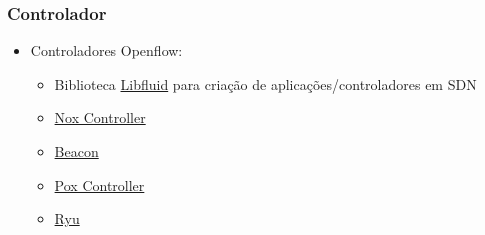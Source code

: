 %
%
\begin{frame}\frametitle{Controlador}

    \begin{itemize}
    \item Controladores Openflow:
          \begin{itemize}
          \item Biblioteca \href{http://opennetworkingfoundation.github.io/libfluid/index.html}{Libfluid}
                para criação de aplicações/controladores em SDN
          \item \href{http://www.noxrepo.org/nox/about-nox/}{Nox Controller}
          \item \href{https://openflow.stanford.edu/display/Beacon/Home}{Beacon}
          \item \href{http://www.noxrepo.org/pox/about-pox/}{Pox Controller}
          \item \href{http://osrg.github.io/ryu/}{Ryu}
          \end{itemize}
    \end{itemize}
\end{frame}

